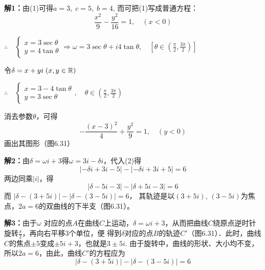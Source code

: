 \begin{solution}
   \textbf{解1：}由(1)可得$a=3,\; c=5,\; b=4$, 而可把(1)写成普通方程： 
\[\frac{x^2}{9}-\frac{y^2}{16}=1,\quad (x<0)\]

$\therefore\quad \begin{cases}
    x=3\sec\theta \\ y=4\tan\theta
\end{cases} \Rightarrow \omega =3\sec\theta+i4\tan\theta,\quad \left[\theta\in\left(\frac{\pi}{2},\frac{3\pi}{2}\right)\right]$

令$\delta=x+yi\; (x,y\in\mathbb{R})$

$\therefore\quad \begin{cases}
    x=3-4\tan\theta  \\ y=3\sec\theta 
\end{cases},\quad \theta\in\left(\frac{\pi}{2},\frac{3\pi}{2}\right)$

消去参数$\theta$，可得
\[-\frac{(x-3)^2}{4}+\frac{y^2}{9}=1,\quad (y<0)\]
画出其图形（图6.31）

\noindent
\begin{minipage}{.55\textwidth}\CTEXindent
\textbf{解2：}由$\delta =\omega i+3$得$\omega =3i-\delta i$，代入(2)得
\[|-\delta i+3i-5|-|-\delta i+3i+5|=6\]
两边同乘$|i|$，得
\[|\delta -5i-3|-|\delta +5i-3|=6\]
而
$|\delta -(3+5i)|-|\delta -(3-5i)|=6$，
其轨迹是以$(3+5i)$, $(3-5i)$为焦点，$2a=6$的双曲线的下半支（图6.31）。    
\end{minipage}
\begin{minipage}{.4\textwidth}
\centering
{}
\end{minipage}


\textbf{解3：}由于$\omega$ 对应的点$A$在曲线$C$上运动，$\delta =\omega i+3$，从而把曲线$C$绕原点逆时针旋转$\frac{\pi}{2}$，再向右平移3个单位，便
得到$\delta $对应的点$B$的轨迹$C'$（图6.31）．此时，曲线$C$的焦点$\pm 5$变成$\pm 5i+3$，也就是$3\pm 5i$. 由于旋转中，曲线的形状、大小均不变，所以$2a=6$，由此，曲线$C'$的方程应为
\[|\delta -(3+5i)|-|\delta -(3-5i)|=6\]
\end{solution}


